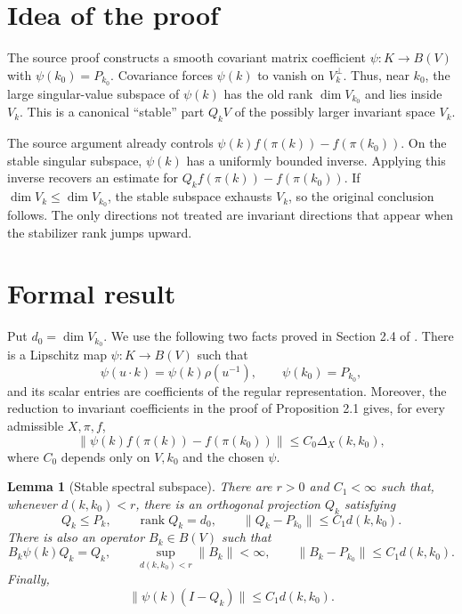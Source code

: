 \documentclass[11pt]{article}
\newtheorem{lemma}[theorem]{Lemma}
\begin{document}
\section{Idea of the proof}

The source proof constructs a smooth covariant matrix coefficient $\psi:K\to B(V)$ with $\psi(k_0)=P_{k_0}$.  Covariance forces $\psi(k)$ to vanish on $V_k^\perp$.  Thus, near $k_0$, the large singular-value subspace of $\psi(k)$ has the old rank $\dim V_{k_0}$ and lies inside $V_k$.  This is a canonical ``stable'' part $Q_kV$ of the possibly larger invariant space $V_k$.

The source argument already controls $\psi(k)f(\pi(k))-f(\pi(k_0))$.  On the stable singular subspace, $\psi(k)$ has a uniformly bounded inverse.  Applying this inverse recovers an estimate for $Q_kf(\pi(k))-f(\pi(k_0))$.  If $\dim V_k\leq\dim V_{k_0}$, the stable subspace exhausts $V_k$, so the original conclusion follows.  The only directions not treated are invariant directions that appear when the stabilizer rank jumps upward.

\section{Formal result}

Put $d_0=\dim V_{k_0}$.  We use the following two facts proved in Section 2.4 of \cite{source}.  There is a Lipschitz map $\psi:K\to B(V)$ such that
\begin{equation}\label{eq:psi-properties}
 \psi(u\cdot k)=\psi(k)\rho(u^{-1}),
 \qquad \psi(k_0)=P_{k_0},
\end{equation}
and its scalar entries are coefficients of the regular representation.  Moreover, the reduction to invariant coefficients in the proof of Proposition 2.1 gives, for every admissible $X,\pi,f$,
\begin{equation}\label{eq:source-estimate}
 \|\psi(k)f(\pi(k))-f(\pi(k_0))\|
 \leq C_0\Delta_X(k,k_0),
\end{equation}
where $C_0$ depends only on $V,k_0$ and the chosen $\psi$.

\begin{lemma}[Stable spectral subspace]\label{lem:stable}
There are $r>0$ and $C_1<\infty$ such that, whenever $d(k,k_0)<r$, there is an orthogonal projection $Q_k$ satisfying
\[
 Q_k\leq P_k,\qquad \operatorname{rank}Q_k=d_0,
 \qquad \|Q_k-P_{k_0}\|\leq C_1d(k,k_0).
\]
There is also an operator $B_k\in B(V)$ such that
\[
 B_k\psi(k)Q_k=Q_k,\qquad
 \sup_{d(k,k_0)<r}\|B_k\|<\infty,\qquad
 \|B_k-P_{k_0}\|\leq C_1d(k,k_0).
\]
Finally,
\[
 \|\psi(k)(I-Q_k)\|\leq C_1d(k,k_0).
\]
\end{lemma}
\end{document}
